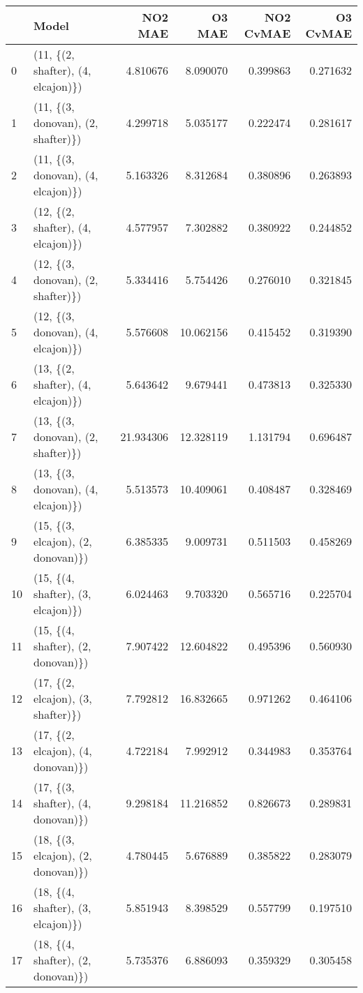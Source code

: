 \begin{tabular}{llrrrr}
\toprule
{} &                               Model &    NO2 MAE &     O3 MAE &  NO2 CvMAE &  O3 CvMAE \\
\midrule
0  &  (11, \{(2, shafter), (4, elcajon)\}) &   4.810676 &   8.090070 &   0.399863 &  0.271632 \\
1  &  (11, \{(3, donovan), (2, shafter)\}) &   4.299718 &   5.035177 &   0.222474 &  0.281617 \\
2  &  (11, \{(3, donovan), (4, elcajon)\}) &   5.163326 &   8.312684 &   0.380896 &  0.263893 \\
3  &  (12, \{(2, shafter), (4, elcajon)\}) &   4.577957 &   7.302882 &   0.380922 &  0.244852 \\
4  &  (12, \{(3, donovan), (2, shafter)\}) &   5.334416 &   5.754426 &   0.276010 &  0.321845 \\
5  &  (12, \{(3, donovan), (4, elcajon)\}) &   5.576608 &  10.062156 &   0.415452 &  0.319390 \\
6  &  (13, \{(2, shafter), (4, elcajon)\}) &   5.643642 &   9.679441 &   0.473813 &  0.325330 \\
7  &  (13, \{(3, donovan), (2, shafter)\}) &  21.934306 &  12.328119 &   1.131794 &  0.696487 \\
8  &  (13, \{(3, donovan), (4, elcajon)\}) &   5.513573 &  10.409061 &   0.408487 &  0.328469 \\
9  &  (15, \{(3, elcajon), (2, donovan)\}) &   6.385335 &   9.009731 &   0.511503 &  0.458269 \\
10 &  (15, \{(4, shafter), (3, elcajon)\}) &   6.024463 &   9.703320 &   0.565716 &  0.225704 \\
11 &  (15, \{(4, shafter), (2, donovan)\}) &   7.907422 &  12.604822 &   0.495396 &  0.560930 \\
12 &  (17, \{(2, elcajon), (3, shafter)\}) &   7.792812 &  16.832665 &   0.971262 &  0.464106 \\
13 &  (17, \{(2, elcajon), (4, donovan)\}) &   4.722184 &   7.992912 &   0.344983 &  0.353764 \\
14 &  (17, \{(3, shafter), (4, donovan)\}) &   9.298184 &  11.216852 &   0.826673 &  0.289831 \\
15 &  (18, \{(3, elcajon), (2, donovan)\}) &   4.780445 &   5.676889 &   0.385822 &  0.283079 \\
16 &  (18, \{(4, shafter), (3, elcajon)\}) &   5.851943 &   8.398529 &   0.557799 &  0.197510 \\
17 &  (18, \{(4, shafter), (2, donovan)\}) &   5.735376 &   6.886093 &   0.359329 &  0.305458 \\

\end{tabular}
